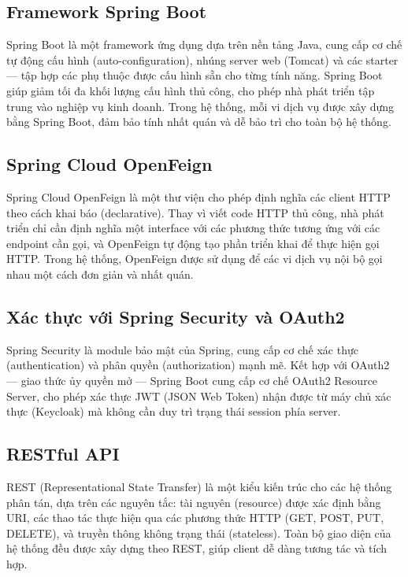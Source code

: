 \documentclass[../BTL.tex]{subfiles}
\begin{document}
\subsection{Framework Spring Boot}
\label{section:2.3.2}

Spring Boot là một framework ứng dụng dựa trên nền tảng Java, cung cấp cơ chế tự động cấu hình (auto-configuration), nhúng server web (Tomcat) và các starter --- tập hợp các phụ thuộc được cấu hình sẵn cho từng tính năng. Spring Boot giúp giảm tối đa khối lượng cấu hình thủ công, cho phép nhà phát triển tập trung vào nghiệp vụ kinh doanh. Trong hệ thống, mỗi vi dịch vụ được xây dựng bằng Spring Boot, đảm bảo tính nhất quán và dễ bảo trì cho toàn bộ hệ thống.

\subsection{Spring Cloud OpenFeign}
\label{section:2.3.3}

Spring Cloud OpenFeign là một thư viện cho phép định nghĩa các client HTTP theo cách khai báo (declarative). Thay vì viết code HTTP thủ công, nhà phát triển chỉ cần định nghĩa một interface với các phương thức tương ứng với các endpoint cần gọi, và OpenFeign tự động tạo phần triển khai để thực hiện gọi HTTP. Trong hệ thống, OpenFeign được sử dụng để các vi dịch vụ nội bộ gọi nhau một cách đơn giản và nhất quán.

\subsection{Xác thực với Spring Security và OAuth2}
\label{section:2.3.4}

Spring Security là module bảo mật của Spring, cung cấp cơ chế xác thực (authentication) và phân quyền (authorization) mạnh mẽ. Kết hợp với OAuth2 --- giao thức ủy quyền mở --- Spring Boot cung cấp cơ chế OAuth2 Resource Server, cho phép xác thực JWT (JSON Web Token) nhận được từ máy chủ xác thực (Keycloak) mà không cần duy trì trạng thái session phía server.

\subsection{RESTful API}
\label{section:2.3.5}

REST (Representational State Transfer) là một kiểu kiến trúc cho các hệ thống phân tán, dựa trên các nguyên tắc: tài nguyên (resource) được xác định bằng URI, các thao tác thực hiện qua các phương thức HTTP (GET, POST, PUT, DELETE), và truyền thông không trạng thái (stateless). Toàn bộ giao diện của hệ thống đều được xây dựng theo REST, giúp client dễ dàng tương tác và tích hợp.
\end{document}
